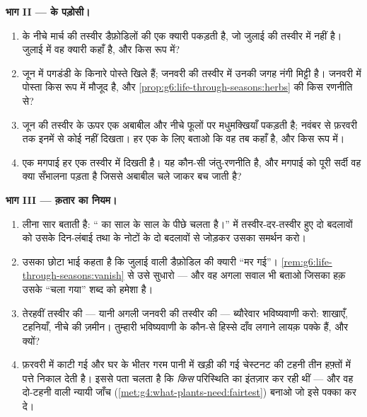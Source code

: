 \begin{problem}
\medskip\noindent\textbf{भाग II ---  के पड़ोसी।}
\begin{enumerate}[resume]
  \item {} के नीचे मार्च की तस्वीर डैफ़ोडिलों की एक क्यारी पकड़ती है,
        जो जुलाई की तस्वीर में नहीं है। जुलाई में वह क्यारी कहाँ है,
        और किस रूप में?
  \item जून में पगडंडी के किनारे पोस्ते खिले हैं; जनवरी की तस्वीर में
        उनकी जगह नंगी मिट्टी है। जनवरी में पोस्ता किस रूप में मौजूद
        है, और \cref{prop:g6:life-through-seasons:herbs} की किस
        रणनीति से?
  \item जून की तस्वीर  के ऊपर एक अबाबील और नीचे फूलों पर
        मधुमक्खियाँ पकड़ती है; नवंबर से फ़रवरी तक इनमें से कोई नहीं
        दिखता। हर एक के लिए बताओ कि वह तब कहाँ है, और किस रूप में।
  \item एक मगपाई हर एक तस्वीर में दिखती है। यह कौन-सी जंतु-रणनीति है,
        और मगपाई को पूरी सर्दी वह क्या सँभालना पड़ता है जिससे अबाबील
        चले जाकर बच जाती है?
\end{enumerate}

\medskip\noindent\textbf{भाग III --- क़तार का नियम।}
\begin{enumerate}[resume]
  \item लीना सार बताती है: `` का साल  के साल के पीछे
        चलता है।''  में तस्वीर-दर-तस्वीर हुए दो बदलावों को उसके
        दिन-लंबाई तथा  के नोटों के दो बदलावों से जोड़कर उसका समर्थन
        करो।
  \item उसका छोटा भाई कहता है कि जुलाई वाली डैफ़ोडिल की क्यारी ``मर
        गई''। \cref{rem:g6:life-through-seasons:vanish} से उसे सुधारो
        --- और वह अगला सवाल भी बताओ जिसका हक़ उसके ``चला गया'' शब्द को
        हमेशा है।
  \item तेरहवीं तस्वीर की --- यानी अगली जनवरी की तस्वीर की ---
        ब्यौरेवार भविष्यवाणी करो: शाखाएँ, टहनियाँ, नीचे की ज़मीन।
        तुम्हारी भविष्यवाणी के कौन-से हिस्से दाँव लगाने लायक़ पक्के
        हैं, और क्यों?
  \item फ़रवरी में काटी गई और घर के भीतर गरम पानी में खड़ी की गई
        चेस्टनट की टहनी तीन हफ़्तों में पत्ते निकाल देती है। इससे पता
        चलता है कि  \emph{किस} परिस्थिति का इंतज़ार कर रही थीं
        --- और वह दो-टहनी वाली न्यायी जाँच
        (\cref{met:g4:what-plants-need:fairtest}) बनाओ जो इसे पक्का
        कर दे।
\end{enumerate}
\end{problem}
